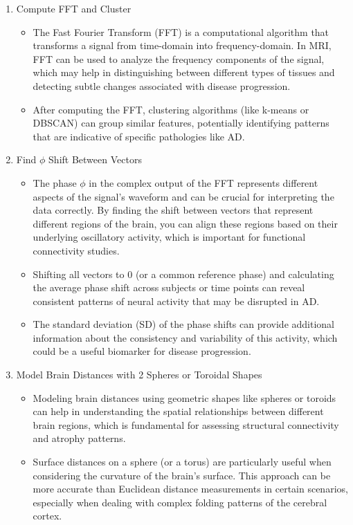 \documentclass[twocolumn]{article}
\begin{document}
\begin{enumerate}
\item Compute FFT and Cluster
\begin{itemize}
    \item The Fast Fourier Transform (FFT) is a computational algorithm that transforms a signal from time-domain into frequency-domain. In MRI, FFT can be used to analyze the frequency components of the signal, which may help in distinguishing between different types of tissues and detecting subtle changes associated with disease progression.
    \item After computing the FFT, clustering algorithms (like k-means or DBSCAN) can group similar features, potentially identifying patterns that are indicative of specific pathologies like AD.
\end{itemize}
\item Find $\phi$  Shift Between Vectors
\begin{itemize}
    \item The phase $\phi$ in the complex output of the FFT represents different aspects of the signal's waveform and can be crucial for interpreting the data correctly. By finding the shift between vectors that represent different regions of the brain, you can align these regions based on their underlying oscillatory activity, which is important for functional connectivity studies.
    \item Shifting all vectors to 0 (or a common reference phase) and calculating the average phase shift across subjects or time points can reveal consistent patterns of neural activity that may be disrupted in AD.
    \item The standard deviation (SD) of the phase shifts can provide additional information about the consistency and variability of this activity, which could be a useful biomarker for disease progression.
\end{itemize}
\item Model Brain Distances with 2 Spheres or Toroidal Shapes
\begin{itemize}
    \item Modeling brain distances using geometric shapes like spheres or toroids can help in understanding the spatial relationships between different brain regions, which is fundamental for assessing structural connectivity and atrophy patterns.
    \item Surface distances on a sphere (or a torus) are particularly useful when considering the curvature of the brain's surface. This approach can be more accurate than Euclidean distance measurements in certain scenarios, especially when dealing with complex folding patterns of the cerebral cortex.

\end{itemize}
\end{enumerate}
\end{document}
